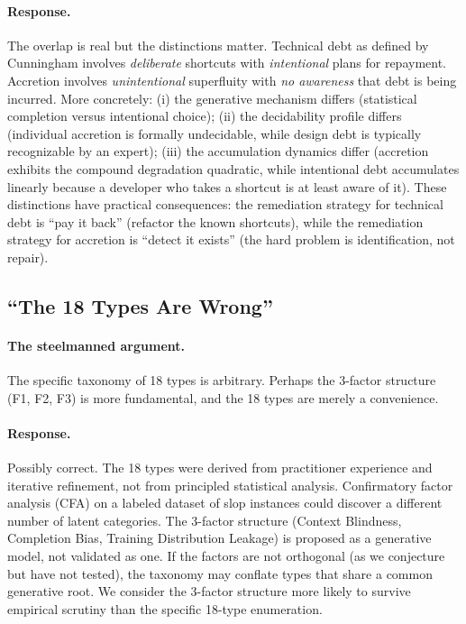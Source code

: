 \documentclass[11pt, a4paper, logo, copyright]{googledeepmind}
\begin{document}
\paragraph{Response.} The overlap is real but the distinctions matter. Technical debt as defined by Cunningham \citep{cunningham1992} involves \emph{deliberate} shortcuts with \emph{intentional} plans for repayment. Accretion involves \emph{unintentional} superfluity with \emph{no awareness} that debt is being incurred. More concretely: (i) the generative mechanism differs (statistical completion versus intentional choice); (ii) the decidability profile differs (individual accretion is formally undecidable, while design debt is typically recognizable by an expert); (iii) the accumulation dynamics differ (accretion exhibits the compound degradation quadratic, while intentional debt accumulates linearly because a developer who takes a shortcut is at least aware of it). These distinctions have practical consequences: the remediation strategy for technical debt is ``pay it back'' (refactor the known shortcuts), while the remediation strategy for accretion is ``detect it exists'' (the hard problem is identification, not repair).

\subsection{``The 18 Types Are Wrong''}

\paragraph{The steelmanned argument.} The specific taxonomy of 18 types is arbitrary. Perhaps the 3-factor structure (F1, F2, F3) is more fundamental, and the 18 types are merely a convenience.

\paragraph{Response.} Possibly correct. The 18 types were derived from practitioner experience and iterative refinement, not from principled statistical analysis. Confirmatory factor analysis (CFA) on a labeled dataset of slop instances could discover a different number of latent categories. The 3-factor structure (Context Blindness, Completion Bias, Training Distribution Leakage) is proposed as a generative model, not validated as one. If the factors are not orthogonal (as we conjecture but have not tested), the taxonomy may conflate types that share a common generative root. We consider the 3-factor structure more likely to survive empirical scrutiny than the specific 18-type enumeration.
\end{document}
